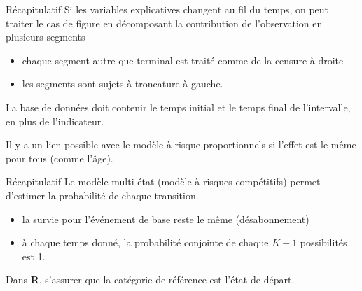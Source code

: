 \documentclass[
  ignorenonframetext,
]{beamer}
\providecommand{\tightlist}{%
  \setlength{\itemsep}{0pt}\setlength{\parskip}{0pt}}
\begin{document}
\begin{frame}{Récapitulatif}
\protect{}\label{ruxe9capitulatif-1}
Si les variables explicatives changent au fil du temps, on peut traiter
le cas de figure en décomposant la contribution de l'observation en
plusieurs segments

\begin{itemize}
\tightlist
\item
  chaque segment autre que terminal est traité comme de la censure à
  droite
\item
  les segments sont sujets à troncature à gauche.
\end{itemize}

La base de données doit contenir le temps initial et le temps final de
l'intervalle, en plus de l'indicateur.

Il y a un lien possible avec le modèle à risque proportionnels si
l'effet est le même pour tous (comme l'âge).
\end{frame}

\begin{frame}{Récapitulatif}
\protect{}\label{ruxe9capitulatif-2}
Le modèle multi-état (modèle à risques compétitifs) permet d'estimer la
probabilité de chaque transition.

\begin{itemize}
\tightlist
\item
  la survie pour l'événement de base reste le même (désabonnement)
\item
  à chaque temps donné, la probabilité conjointe de chaque \(K+1\)
  possibilités est 1.
\end{itemize}

Dans \textbf{R}, s'assurer que la catégorie de référence est l'état de
départ.
\end{frame}
\end{document}
